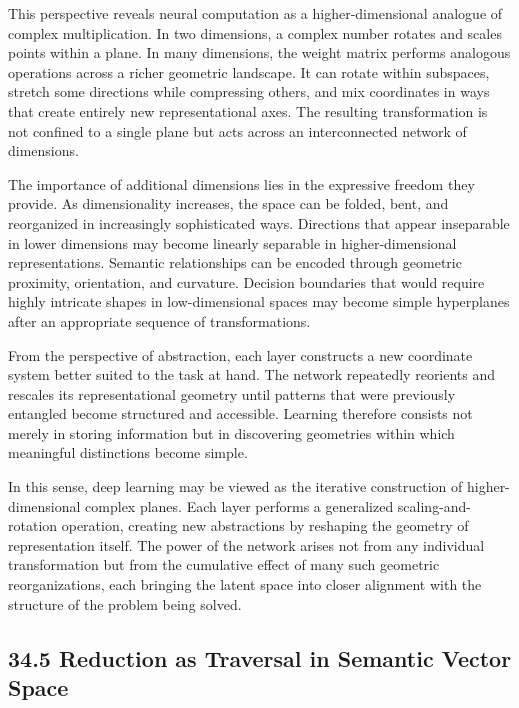 \documentclass[12pt,letterpaper]{article}
\theoremstyle{remark}
\begin{document}
This perspective reveals neural computation as a higher-dimensional analogue of complex multiplication. In two dimensions, a complex number rotates and scales points within a plane. In many dimensions, the weight matrix performs analogous operations across a richer geometric landscape. It can rotate within subspaces, stretch some directions while compressing others, and mix coordinates in ways that create entirely new representational axes. The resulting transformation is not confined to a single plane but acts across an interconnected network of dimensions.

The importance of additional dimensions lies in the expressive freedom they provide. As dimensionality increases, the space can be folded, bent, and reorganized in increasingly sophisticated ways. Directions that appear inseparable in lower dimensions may become linearly separable in higher-dimensional representations. Semantic relationships can be encoded through geometric proximity, orientation, and curvature. Decision boundaries that would require highly intricate shapes in low-dimensional spaces may become simple hyperplanes after an appropriate sequence of transformations.

From the perspective of abstraction, each layer constructs a new coordinate system better suited to the task at hand. The network repeatedly reorients and rescales its representational geometry until patterns that were previously entangled become structured and accessible. Learning therefore consists not merely in storing information but in discovering geometries within which meaningful distinctions become simple.

In this sense, deep learning may be viewed as the iterative construction of higher-dimensional complex planes. Each layer performs a generalized scaling-and-rotation operation, creating new abstractions by reshaping the geometry of representation itself. The power of the network arises not from any individual transformation but from the cumulative effect of many such geometric reorganizations, each bringing the latent space into closer alignment with the structure of the problem being solved.

\subsection{34.5 Reduction as Traversal in Semantic Vector Space}
\end{document}

